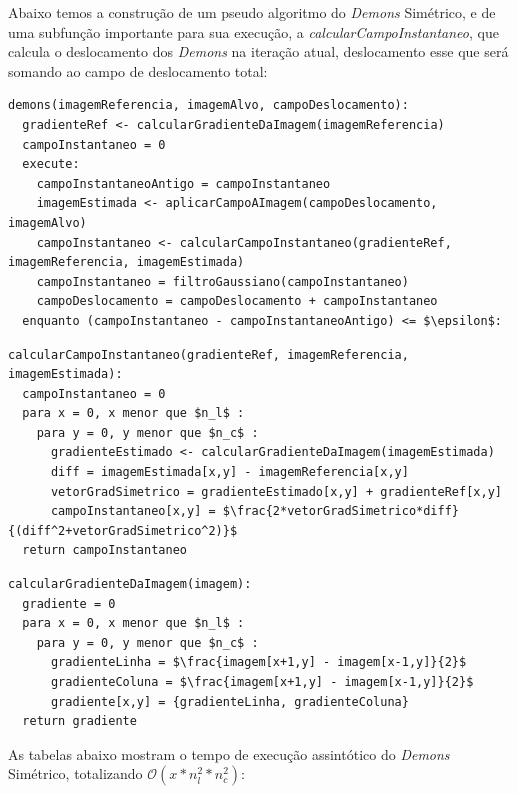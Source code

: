   Abaixo temos a construção de um pseudo algoritmo do \textit{Demons} Simétrico, e de uma subfunção importante para sua 
execução, a \textit{calcularCampoInstantaneo}, que calcula o deslocamento dos \textit{Demons} na iteração atual, 
deslocamento esse que será somando ao campo de deslocamento total:

\begin{lstlisting}[mathescape]
demons(imagemReferencia, imagemAlvo, campoDeslocamento):
  gradienteRef <- calcularGradienteDaImagem(imagemReferencia)
  campoInstantaneo = 0
  execute:
    campoInstantaneoAntigo = campoInstantaneo
    imagemEstimada <- aplicarCampoAImagem(campoDeslocamento, imagemAlvo)
    campoInstantaneo <- calcularCampoInstantaneo(gradienteRef, imagemReferencia, imagemEstimada)
    campoInstantaneo = filtroGaussiano(campoInstantaneo)
    campoDeslocamento = campoDeslocamento + campoInstantaneo
  enquanto (campoInstantaneo - campoInstantaneoAntigo) <= $\epsilon$:
\end{lstlisting}

\begin{lstlisting}[mathescape]
calcularCampoInstantaneo(gradienteRef, imagemReferencia, imagemEstimada):
  campoInstantaneo = 0
  para x = 0, x menor que $n_l$ :
    para y = 0, y menor que $n_c$ :
      gradienteEstimado <- calcularGradienteDaImagem(imagemEstimada)
      diff = imagemEstimada[x,y] - imagemReferencia[x,y]
      vetorGradSimetrico = gradienteEstimado[x,y] + gradienteRef[x,y]
      campoInstantaneo[x,y] = $\frac{2*vetorGradSimetrico*diff}{(diff^2+vetorGradSimetrico^2)}$
  return campoInstantaneo
\end{lstlisting}

\begin{lstlisting}[mathescape]
calcularGradienteDaImagem(imagem):
  gradiente = 0
  para x = 0, x menor que $n_l$ :
    para y = 0, y menor que $n_c$ :
      gradienteLinha = $\frac{imagem[x+1,y] - imagem[x-1,y]}{2}$
      gradienteColuna = $\frac{imagem[x+1,y] - imagem[x-1,y]}{2}$
      gradiente[x,y] = {gradienteLinha, gradienteColuna}
  return gradiente
\end{lstlisting}

  As tabelas abaixo mostram o tempo de execução assintótico do \textit{Demons} Simétrico, totalizando 
$\mathcal{O}(x*n_l^2*n_c^2)$:

